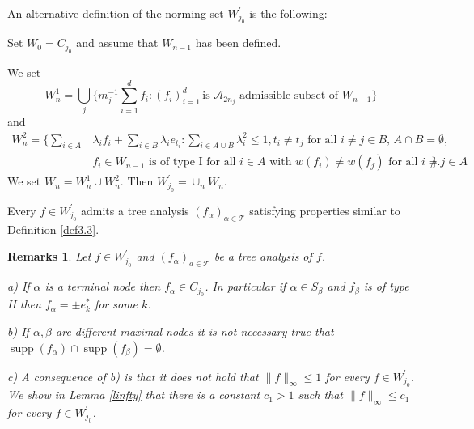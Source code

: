 \documentclass[a4paper]{amsart}
\theoremstyle{plain}
\newtheorem{remarks}[theorem]{Remarks}
\newcommand{\mc}{\mathcal}
\newcommand{\fa}{f_{\alpha}}
\newcommand{\fb}{f_{\beta}}
\newcommand{\norm}[1][\cdot]{\lVert #1\rVert}
\DeclareMathOperator{\supp}{supp}
\begin{document}
An alternative definition of the norming set $W_{j_0}^{\prime}$ is the following:

Set $W_{0}=C_{j_0}$ and assume that $W_{n-1}$ has been defined.

We set
$$W_{n}^{1}=\bigcup_{j}\{m_{j}^{-1}\sum_{i=1}^{d}f_{i}: (f_{i})_{i=1}^{d}\,\text{is $\mc{A}_{2n_{j}}$-admissible subset of $W_{n-1}$}\}
$$
and
\begin{align*}
W_{n}^{2}=\{\sum_{i\in A}&\lambda_{i}f_{i}+\sum_{i\in B}\lambda_{i}e_{t_i}: \sum_{i\in A\cup B}\lambda_{i}^{2}\leq 1, \text{$t_{i}\ne t_{j}$ for all $i\ne j\in B$, $A\cap B=\emptyset$,}\\
& \text{$f_{i}\in W_{n-1}$ is of type I for all $i\in A$ with $w(f_{i})\ne w(f_{j})$ for
all $i\ne j\in A$}\}.
\end{align*}
We set $W_{n}=W_{n}^{1}\cup W_{n}^{2}$. Then $W_{j_0}^{\prime}=\cup_n W_n$.

Every $f\in W_{j_0}^{\prime}$ admits a tree analysis $(\fa)_{\alpha\in\mc{T}}$ satisfying
properties similar to Definition \ref{def3.3}.
\begin{remarks} Let $f\in W_{j_0}^{\prime}$ and $(\fa)_{a\in\mc{T}}$ be a tree analysis of $f$.


a) If $\alpha$ is a terminal node then $\fa\in  C_{j_0}$.  In particular if $\alpha\in
S_{\beta}$ and $\fb$ is of type II then  $\fa=\pm e_{k}^{*}$ for some $k$.


b) If $\alpha,\beta$ are different maximal nodes it is not necessary true that $\supp(\fa)\cap\supp(\fb)=\emptyset$.

c) A consequence of b) is that  it does not hold that $\norm[f]_{\infty}\leq 1$ for every $f\in W_{j_0}^{\prime}$. We show  in Lemma \ref{linfty} that there is a constant $c_1>1$ such that  $\norm[f]_{\infty}\leq c_{1}$ for every $f\in W_{j_0}^{\prime}$.
\end{remarks}
\end{document}
